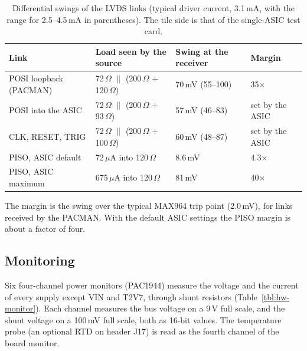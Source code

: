 \documentclass[12pt]{article}
\begin{document}
\begin{table}[htbp]
\caption{\label{tbl:hw-lvds} Differential swings of the LVDS links (typical driver current, 3.1\,mA, with
  the range for 2.5--4.5\,mA in parentheses).  The tile side is that of the single-ASIC test card.}
\begin{center}
\begin{tabular}{llll}
Link                      & Load seen by the source                                  & Swing at the receiver  & Margin \\
\hline
POSI loopback (PACMAN)    & 72\,$\Omega$ $\parallel$ (200\,$\Omega$ + 120\,$\Omega$)  & 70\,mV (55--100)       & 35$\times$ \\
POSI into the ASIC        & 72\,$\Omega$ $\parallel$ (200\,$\Omega$ + 93\,$\Omega$)   & 57\,mV (46--83)        & set by the ASIC \\
CLK, RESET, TRIG          & 72\,$\Omega$ $\parallel$ (200\,$\Omega$ + 100\,$\Omega$)  & 60\,mV (48--87)        & set by the ASIC \\
PISO, ASIC default        & 72\,$\mu$A into 120\,$\Omega$                             & 8.6\,mV                & 4.3$\times$ \\
PISO, ASIC maximum        & 675\,$\mu$A into 120\,$\Omega$                            & 81\,mV                 & 40$\times$ \\
\end{tabular}
\end{center}
\end{table}
The margin is the swing over the typical MAX964 trip point (2.0\,mV), for links received by the PACMAN.
With the default ASIC settings the PISO margin is about a factor of four.

\subsection{Monitoring}

Six four-channel power monitors (PAC1944) measure the voltage and the current of every supply except VIN and T2V7, through shunt
resistors (Table~\ref{tbl:hw-monitor}).  Each channel measures the bus voltage on a 9\,V full scale, and the
shunt voltage on a 100\,mV full scale, both as 16-bit values.  The temperature probe (an optional RTD on
header J17) is read as the fourth channel of the board monitor.
\end{document}
